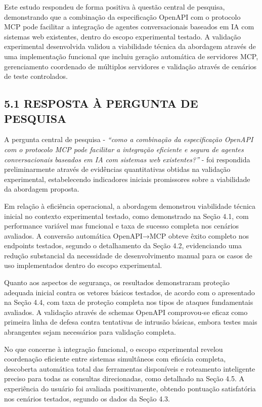 \documentclass[
]{article}
\begin{document}
Este estudo respondeu de forma positiva à questão central de pesquisa,
demonstrando que a combinação da especificação OpenAPI com o protocolo
MCP pode facilitar a integração de agentes conversacionais baseados em
IA com sistemas web existentes, dentro do escopo experimental testado. A
validação experimental desenvolvida validou a viabilidade técnica da
abordagem através de uma implementação funcional que incluiu geração
automática de servidores MCP, gerenciamento coordenado de múltiplos
servidores e validação através de cenários de teste controlados.

\subsection{5.1 RESPOSTA À PERGUNTA DE
PESQUISA}\label{resposta-uxe0-pergunta-de-pesquisa}

A pergunta central de pesquisa - \emph{``como a combinação da
especificação OpenAPI com o protocolo MCP pode facilitar a integração
eficiente e segura de agentes conversacionais baseados em IA com
sistemas web existentes?''} - foi respondida preliminarmente através de
evidências quantitativas obtidas na validação experimental,
estabelecendo indicadores iniciais promissores sobre a viabilidade da
abordagem proposta.

Em relação à eficiência operacional, a abordagem demonstrou viabilidade
técnica inicial no contexto experimental testado, como demonstrado na
Seção 4.1, com performance variável mas funcional e taxa de sucesso
completa nos cenários avaliados. A conversão automática OpenAPI→MCP
obteve êxito completo nos endpoints testados, segundo o detalhamento da
Seção 4.2, evidenciando uma redução substancial da necessidade de
desenvolvimento manual para os casos de uso implementados dentro do
escopo experimental.

Quanto aos aspectos de segurança, os resultados demonstraram proteção
adequada inicial contra os vetores básicos testados, de acordo com o
apresentado na Seção 4.4, com taxa de proteção completa nos tipos de
ataques fundamentais avaliados. A validação através de schemas OpenAPI
comprovou-se eficaz como primeira linha de defesa contra tentativas de
intrusão básicas, embora testes mais abrangentes sejam necessários para
validação completa.

No que concerne à integração funcional, o escopo experimental revelou
coordenação eficiente entre sistemas simultâneos com eficácia completa,
descoberta automática total das ferramentas disponíveis e roteamento
inteligente preciso para todas as consultas direcionadas, como detalhado
na Seção 4.5. A experiência do usuário foi avaliada positivamente,
obtendo pontuação satisfatória nos cenários testados, segundo os dados
da Seção 4.3.
\end{document}
